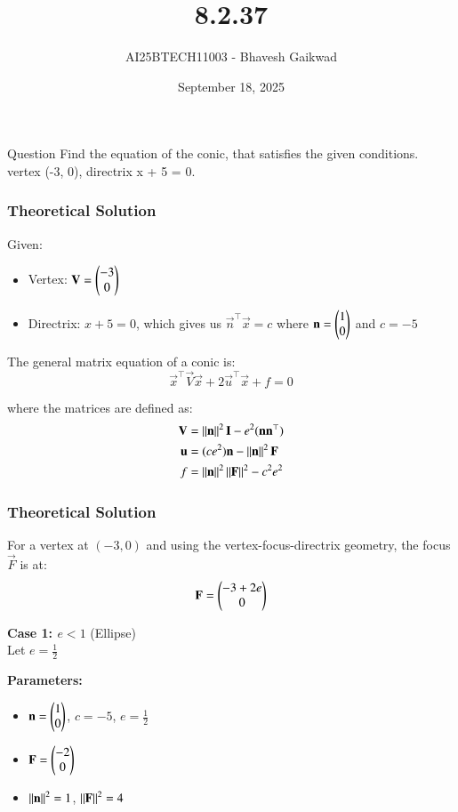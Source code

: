 \documentclass{beamer}
\title
{8.2.37}
\date{September 18, 2025}
\author 
{AI25BTECH11003 - Bhavesh Gaikwad}
\begin{document}
\frame{\titlepage}
\begin{frame}{Question}
Find the equation of the conic, that satisfies the given conditions.
vertex (-3, 0), directrix x + 5 = 0.
\end{frame}


\begin{frame}[fragile]
    \frametitle{Theoretical Solution}
Given:
\begin{itemize}
\item Vertex: $\mathbf{V} = \begin{pmatrix}-3 \\ 0\end{pmatrix}$
\item Directrix: $x + 5 = 0$, which gives us $\vec{n}^\top\vec{x} = c$ where $\mathbf{n} = \begin{pmatrix}1 \\ 0\end{pmatrix}$ and $c = -5$
\end{itemize}

The general matrix equation of a conic is:
\begin{equation}
\vec{x}^\top\vec{V}\vec{x} + 2\vec{u}^\top\vec{x} + f = 0
\end{equation}

where the matrices are defined as:
\begin{align}
\mathbf{V} &= \left\lVert\mathbf{n}\right\rVert^2\mathbf{I} - e^2(\mathbf{n}\mathbf{n}^\top) \\
\mathbf{u} &= (ce^2)\mathbf{n} - \left\lVert\mathbf{n}\right\rVert^2\mathbf{F} \\
f &= \left\lVert\mathbf{n}\right\rVert^2\left\lVert\mathbf{F}\right\rVert^2 - c^2e^2
\end{align}
\end{frame}


\begin{frame}[fragile]
    \frametitle{Theoretical Solution}
For a vertex at $(-3, 0)$ and using the vertex-focus-directrix geometry, the focus $\vec{F}$ is at:
\begin{equation}
\mathbf{F} = \begin{pmatrix}-3 + 2e \\ 0\end{pmatrix}
\end{equation}

\newpage

\textbf{Case 1: $e < 1$} (Ellipse)\\
Let $e = \frac{1}{2}$

\textbf{Parameters:}
\begin{itemize}
\item $\mathbf{n} = \begin{pmatrix}1 \\ 0\end{pmatrix}$, $c = -5$, $e = \frac{1}{2}$
\item $\mathbf{F} = \begin{pmatrix}-2 \\ 0\end{pmatrix}$
\item $\left\lVert\mathbf{n}\right\rVert^2 = 1$, $\left\lVert\mathbf{F}\right\rVert^2 = 4$
\end{itemize}
\end{frame}
\end{document}
